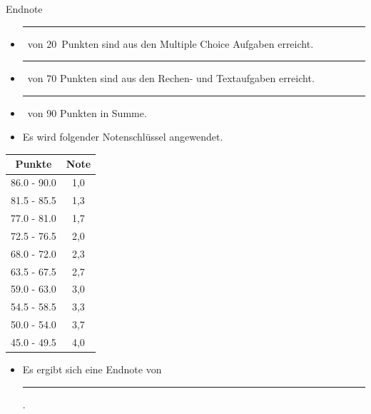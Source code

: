 \documentclass[a4paper, 9pt]{scrartcl}\usepackage[]{graphicx}\usepackage[]{xcolor}
\begin{document}
\begin{graybox}{Endnote}
  \vspace{1Ex}
  \begin{itemize}
  \item[] \rule[0ex]{3em}{.4pt}\, von 20\, Punkten sind aus den Multiple
    Choice Aufgaben erreicht.
  \item[] \rule[0ex]{3em}{.4pt}\, von 70 Punkten sind aus den Rechen- und
    Textaufgaben erreicht. 
  \item[] \rule[0ex]{3em}{.4pt}\, von 90 Punkten in Summe.
  \item[] Es wird folgender Notenschlüssel angewendet.   
  \end{itemize}
  \vspace{1ex}
\begin{center}
  \begin{tabular}[c]{cc}
    \toprule
    \textbf{Punkte}	&	\textbf{Note}	\\
    \midrule
    86.0 - 90.0	&	1,0	\\
    81.5 - 85.5	&	1,3	\\
    77.0 - 81.0	&	1,7	\\
    72.5 - 76.5	&	2,0	\\
    68.0 - 72.0	&	2,3	\\
    63.5 - 67.5	&	2,7	\\
    59.0 - 63.0	&	3,0	\\
    54.5 - 58.5	&	3,3	\\
    50.0 - 54.0	&	3,7	\\
    45.0 - 49.5	&	4,0	\\
    \bottomrule
  \end{tabular}
\end{center}
  \vspace{1ex}
\begin{itemize}
\item[] Es ergibt sich eine Endnote von \rule[0ex]{4em}{.4pt}.
\end{itemize}
  \vspace{1Ex}
\end{graybox}

\newpage
\end{document}

